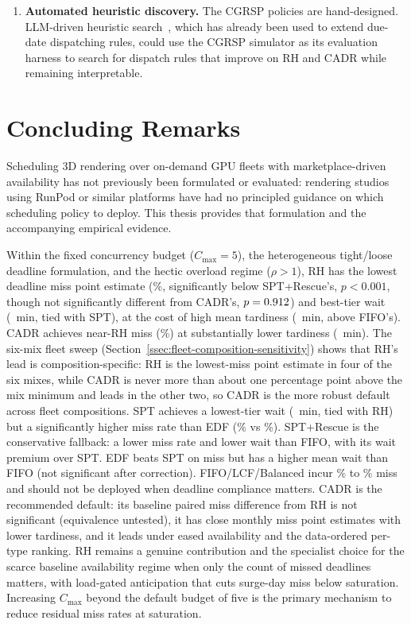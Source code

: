 {\begin{enumerate}
  \item \textbf{Automated heuristic discovery.} The CGRSP policies are hand-designed. LLM-driven heuristic search~\cite{ye2024reevo,cetinkaya2025discovering}, which has already been used to extend due-date dispatching rules, could use the CGRSP simulator as its evaluation harness to search for dispatch rules that improve on RH and CADR while remaining interpretable.
\end{enumerate}

\section{Concluding Remarks}
\label{sec:concluding-remarks}

Scheduling 3D rendering over on-demand GPU fleets with marketplace-driven availability has not previously been formulated or evaluated: rendering studios using RunPod or similar platforms have had no principled guidance on which scheduling policy to deploy. This thesis provides that formulation and the accompanying empirical evidence.

Within the fixed concurrency budget ($C_{\max}=5$), the heterogeneous tight/loose deadline formulation, and the hectic overload regime ($\rho>1$), RH has the lowest deadline miss point estimate (\RHMiss\%, significantly below SPT+Rescue's, $p<0.001$, though not significantly different from CADR's, $p=0.912$) and best-tier wait (\RHWait~min, tied with SPT), at the cost of high mean tardiness (\RHtard~min, above FIFO's). CADR achieves near-RH miss (\CADRmiss\%) at substantially lower tardiness (\CADRtard~min). The six-mix fleet sweep (Section~\ref{ssec:fleet-composition-sensitivity}) shows that RH's lead is composition-specific: RH is the lowest-miss point estimate in four of the six mixes, while CADR is never more than about one percentage point above the mix minimum and leads in the other two, so CADR is the more robust default across fleet compositions. SPT achieves a lowest-tier wait (\SPTwait~min, tied with RH) but a significantly higher miss rate than EDF (\SPTmiss\% vs \EDFmiss\%). SPT+Rescue is the conservative fallback: a lower miss rate and lower wait than FIFO, with its wait premium over SPT. EDF beats SPT on miss but has a higher mean wait than FIFO (not significant after correction). FIFO/LCF/Balanced incur \FIFOmiss\% to \Balancedmiss\% miss and should not be deployed when deadline compliance matters. CADR is the recommended default: its baseline paired miss difference from RH is not significant (equivalence untested), it has close monthly miss point estimates with lower tardiness, and it leads under eased availability and the data-ordered per-type ranking. RH remains a genuine contribution and the specialist choice for the scarce baseline availability regime when only the count of missed deadlines matters, with load-gated anticipation that cuts surge-day miss below saturation. Increasing $C_{\max}$ beyond the default budget of five is the primary mechanism to reduce residual miss rates at saturation.

} %
